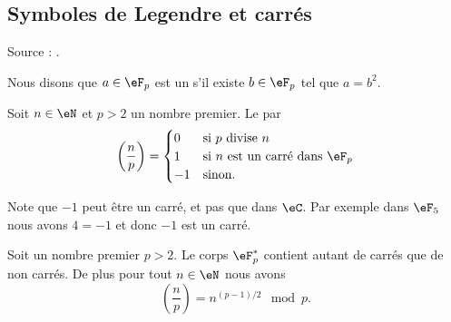 \subsection{Symboles de Legendre et carrés}

Source : \cite{RecQuadVento}.

Nous disons que \( a\in \eF_p\) est un  s'il existe \( b\in \eF_p\) tel que \( a=b^2\).

\begin{definition}
    Soit \( n\in \eN\) et \( p>2\) un nombre premier. Le  par
    \begin{equation}
        \left( \frac{ n }{ p } \right)=\begin{cases}
            0    &   \text{si } p\text{ divise } n\\
            1    &    \text{si } n\text{ est un carré dans } \eF_p\\
            -1    &    \text{sinon}.
        \end{cases}
    \end{equation}
\end{definition}

Note que \( -1\) peut être un carré, et pas que dans \( \eC\). Par exemple dans \( \eF_5\) nous avons \( 4=-1\) et donc \( -1\) est un carré.

\begin{proposition} \label{PropcGsJjk}
    Soit un nombre premier \( p>2\). Le corps \( \eF_p^*\) contient autant de carrés que de non carrés. De plus pour tout \( n\in \eN\) nous avons
    \begin{equation}    \label{Eqbcugos}
        \left(\frac{n}{p}\right)=n^{(p-1)/2}\mod p.
    \end{equation}
\end{proposition}


